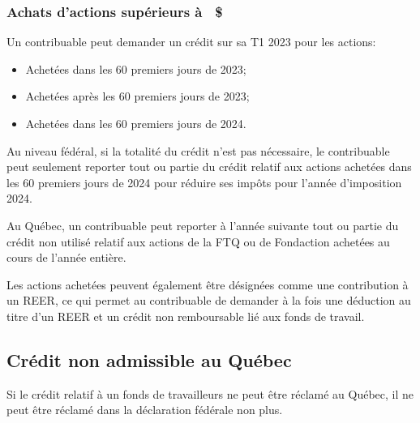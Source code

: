 \subsubsection{Achats d'actions supérieurs à ~\$}
Un contribuable peut demander un crédit sur sa T1 2023 pour les actions:
\begin{itemize}
	\item Achetées dans les 60 premiers jours de 2023;
	\item Achetées après les 60 premiers jours de 2023;
	\item Achetées dans les 60 premiers jours de 2024.
\end{itemize}

Au niveau fédéral, si la totalité du crédit n'est pas nécessaire, le contribuable peut seulement reporter tout ou partie du crédit relatif aux actions achetées dans les 60 premiers jours de 2024 pour réduire ses impôts pour l'année d'imposition 2024.

Au Québec, un contribuable peut reporter à l'année suivante tout ou partie du crédit non utilisé relatif aux actions de la FTQ ou de Fondaction achetées au cours de l'année entière.

Les actions achetées peuvent également être désignées comme une contribution à un REER, ce qui permet au contribuable de demander à la fois une déduction au titre d'un REER et un crédit non remboursable lié aux fonds de travail.


\subsection{Crédit non admissible au Québec}
Si le crédit relatif à un fonds de travailleurs ne peut être réclamé au Québec, il ne peut être réclamé dans la déclaration fédérale non plus.

